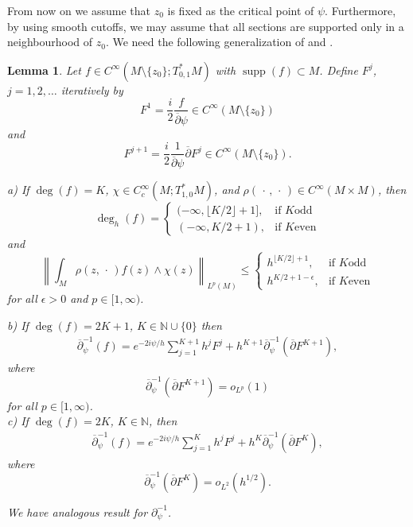 \documentclass[12pt]{amsart}
\def\p{\partial}
\DeclareMathOperator{\supp}{supp}
\newtheorem{lemma}[theorem]{Lemma}
\theoremstyle{definition}
\theoremstyle{remark}
\newcommand{\op}{\overline \p}
\newcommand{\ccdot}{\,\cdot\,}
\begin{document}
From now on we assume that $z_0$ is fixed as the critical point of $\psi$. Furthermore, by using smooth cutoffs, we may assume that all sections are supported only in a neighbourhood of $z_0$. We need the following generalization of \cite[Proposition 2.7]{imanuvilov2010calderon} and \cite[Proposition 3.4]{imanuvilov2012partial}.  
\begin{lemma}\label{lem:expansion}
 Let $f\in C^\infty(M\setminus \{z_0\}; T^*_{0,1}M)$ with $\supp(f) \subset M$. Define $F^j$, $j=1,2,\ldots$ iteratively by
 \[
  F^1=\frac{i}{2}\frac{f}{\overline\p \psi}\in C^\infty(M\setminus \{z_0\})
 \]
 and
 \[
  F^{j+1}=\frac{i}{2}\frac{1}{\overline\p \psi}\overline\p F^j\in C^\infty(M\setminus \{z_0\}).
 \]
 
 {\color{black}

 \noindent a) If $\deg(f) = K$, $\chi \in C^\infty_c(M; T^*_{1,0}M)$, and $\rho(\ccdot,\ccdot)\in C^\infty(M\times M)$, then
$$\deg_h(f) =
    \begin{cases}
      (-\infty,   \lfloor K/2\rfloor+1 ], & \text{if } K \text{odd}\\
      (-\infty,  K/2 + 1) , & \text{if } K \text{even}
    \end{cases} $$
 and 
$$\left\|\int_M \rho(z,\ccdot) f(z)\wedge \chi(z) \right\|_{L^p(M)} \leq
    \begin{cases}
        h^{  \lfloor K/2\rfloor+1 }, & \text{if } K \text{odd}\\
        h^{K/2 + 1 - \epsilon} , & \text{if } K \text{even}
    \end{cases}$$
for all $\epsilon >0$ and $p\in [1,\infty)$.\\
}
 
 \noindent b) If  $\deg(f)=2K+1$, $K\in \mathbb N\cup\{0\}$ then 
 \begin{align}
  \op_{\psi}^{-1}(f)=e^{-2i\psi/h}\sum_{j=1}^{K+1}h^j F^j+ h^{K+1}\op^{-1}_{\psi}(\op F^{K+1}),
 \end{align}
where
 \[
   \op_{\psi}^{-1}(\op F^{K+1})=o_{L^p}(1)
 \]
 for all $p\in [1,\infty)$.\\
 \noindent c) If $\deg(f)=2K$, $K\in \mathbb N$, then 
 \begin{align}
  \op_{\psi}^{-1}(f)=e^{-2i\psi/h}\sum_{j=1}^{K} h^j F^j+ h^{K}\op^{-1}_{\psi}(\op F^{K}),
 \end{align}
where
 \[
   \op_{\psi}^{-1}(\op F^{K})=o_{L^2}(h^{1/2}).
 \]

 
 
We have analogous result for $\p_\psi^{-1}$. 

\end{lemma}
\end{document}
